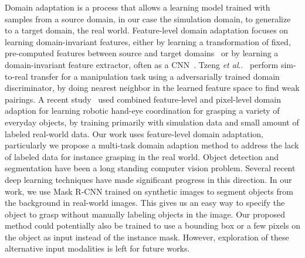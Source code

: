 \documentclass[letterpaper, 10 pt, conference]{ieeeconf}  %
\makeatletter
\newcommand{\etal}{~et al.~}
\DeclareRobustCommand\onedot{\futurelet\@let@token\@onedot}
\def\@onedot{\ifx\@let@token.\else.\null\fi\xspace}
\def\etal{\emph{et al}\onedot}
\makeatother
\begin{document}
Domain adaptation is a process that allows a learning model trained with samples from a source domain, in our case the simulation domain, to generalize to a target domain, the real world. Feature-level domain adaptation focuses on learning domain-invariant features, either by learning a transformation of fixed, pre-computed features between source and target domains~\cite{sun2015return,gong2012geodesic,caseiro2015beyond,gopalan2011domain} or by learning a domain-invariant feature extractor, often as a CNN~\cite{ganin2016domain, long2015learning, tzeng2015ddc, bousmalis2016domain}. Tzeng \etal~\cite{tzeng2016adapting} perform sim-to-real transfer for a manipulation task using a adversarially trained domain discriminator, by doing nearest neighbor in the learned feature space to find weak pairings. A recent study~\cite{bousmalis-2018} used combined feature-level and pixel-level domain adaption for learning robotic hand-eye coordination for grasping a variety of everyday objects, by training primarily with simulation data and small amount of labeled real-world data. Our work uses feature-level domain adaptation, particularly we propose a multi-task domain adaption method to address the lack of labeled data for instance grasping in the real world.
Object detection and segmentation have been a long standing computer vision problem. Several recent deep learning techniques \cite{he2017mask, Girshick2014RichFH, He2014SpatialPP, Girshick2015FastR, ren2015faster, Redmon2016YouOL, Shelhamer2015FullyCN, Chen2017DeepLabSI} have made significant progress in this direction. In our work, we use Mask R-CNN \cite{he2017mask} trained on synthetic images to segment objects from the background in real-world images. This gives us an easy way to specify the object to grasp without manually labeling objects in the image. Our proposed method could potentially also be trained to use a bounding box or a few pixels on the object as input instead of the instance mask. However, exploration of these alternative input modalities is left for future works.

\end{document}
